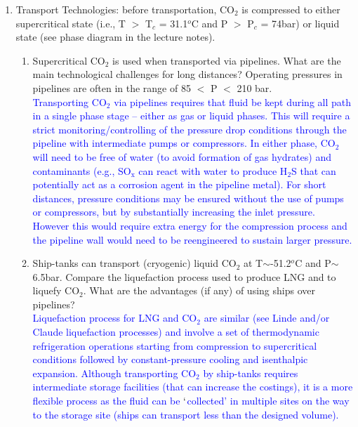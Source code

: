 \documentclass[14pt,twoside]{article}
\begin{document}
\begin{enumerate}
\item Transport Technologies: before transportation, CO$_{2}$ is compressed to either supercritical state (i.e., T $>$ T$_{c}$ = 31.1$^{o}$C and P $>$ P$_{c}$ = 74bar) or liquid state (see phase diagram in the lecture notes).
\begin{enumerate}
\item Supercritical CO$_{2}$ is used when transported via pipelines. What are the main technological challenges for long distances? Operating pressures in pipelines are often in the range of 85 $<$ P $<$ 210 bar.  \\
  \textcolor{blue}{
Transporting CO$_{\text{2}}$ via pipelines requires that fluid be kept during all path in a single phase stage -- either as gas or liquid phases. This will require a strict monitoring/controlling of the pressure drop conditions through the pipeline with intermediate pumps or compressors. In either phase, CO$_{\text{2}}$ will need to be free of water (to avoid formation of gas hydrates) and contaminants (e.g., SO$_{\text{x}}$ can react with water to produce H$_{\text{2}}$S that can potentially act as a corrosion agent in the pipeline metal). For short distances, pressure conditions may be ensured without the use of pumps or compressors, but by substantially increasing the inlet pressure.  However this would require extra energy for the compression process and the pipeline wall would need to be reengineered to sustain larger pressure.  }
\item Ship-tanks can transport (cryogenic) liquid CO$_{2}$ at T$\sim$-51.2$^{o}$C and P$\sim$6.5bar. Compare the liquefaction process used to produce LNG and to liquefy CO$_{2}$. What are the advantages (if any) of using ships over pipelines?\\
  \textcolor{blue}{
Liquefaction process for LNG and CO$_{\text{2}}$ are similar (see Linde and/or Claude liquefaction processes) and involve a set of thermodynamic refrigeration operations starting from compression to supercritical conditions followed by constant-pressure cooling and isenthalpic expansion. Although transporting CO$_{\text{2}}$ by ship-tanks requires intermediate storage facilities (that can increase the costings), it is a more flexible process as the fluid can be $\lq$collected' in multiple sites on the way to the storage site (ships can transport less than the designed volume). }
\end{enumerate}


\end{enumerate}
\end{document}
